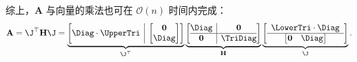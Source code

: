 综上，$\mathbf{A}$ 与向量的乘法也可在 $\mathcal{O}(n)$ 时间内完成：
\begin{equation}
  \mathbf{A} = \J^{\top}\mathbf{H}\J =
  \underbrace{
    \left[
      \begin{array}{@{}c|c@{}}
        \Diag \cdot \UpperTri &
        \begin{bmatrix}
          \mathbf{0} \\
          \Diag
        \end{bmatrix}
      \end{array}
    \right]}_{\J^{\top}}
  \underbrace{
    \left[
      \begin{array}{@{}c|c@{}}
        \Diag      & \mathbf{0} \\
        \hline
        \mathbf{0} & \TriDiag
      \end{array}
    \right]}_{\mathbf{H}}
  \underbrace{
    \left[
      \begin{array}{c}
        \LowerTri \cdot \Diag \\
        \hline
        \begin{bmatrix}
          \mathbf{0} & \Diag \\
        \end{bmatrix}
      \end{array}
    \right]}_{\J}.
\end{equation}

